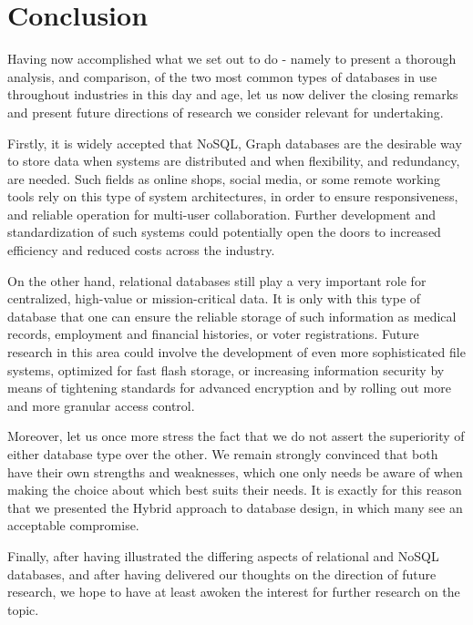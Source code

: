 \documentclass[10pt,        %
               a4paper,     %
               journal,     %
               ]{IEEEtran}
\begin{document}

\section{Conclusion}
Having now accomplished what we set out to do - namely to present a thorough analysis, and comparison, of the two most common types of databases in use throughout industries in this day and age, let us now deliver the closing remarks and present future directions of research we consider relevant for undertaking. \par
Firstly, it is widely accepted that NoSQL, Graph databases are the desirable way to store data  when systems are distributed and when flexibility, and redundancy, are needed. Such fields as online shops, social media, or some remote working tools rely on this type of system architectures, in order to ensure responsiveness, and reliable operation for multi-user collaboration. Further development and standardization of such systems could potentially open the doors to increased efficiency and reduced costs across the industry. \par
On the other hand, relational databases still play a very important role for centralized, high-value or mission-critical data. It is only with this type of database that one can ensure the reliable storage of such information as medical records, employment and financial histories, or voter registrations. Future research in this area could involve the development of even more sophisticated file systems, optimized for fast flash storage, or increasing information security by means of tightening standards for advanced encryption and by rolling out more and more granular access control. \par 
Moreover, let us once more stress the fact that we do not assert the superiority of either database type over the other. We remain strongly convinced that both have their own strengths and weaknesses, which one only needs be aware of when making the choice about which best suits their needs. It is exactly for this reason that we presented the Hybrid approach to database design, in which many see an acceptable compromise. \par
Finally, after having illustrated the differing aspects of relational and NoSQL databases, and after having delivered our thoughts on the direction of future research, we hope to have at least awoken the interest for further research on the topic. 
\end{document}
